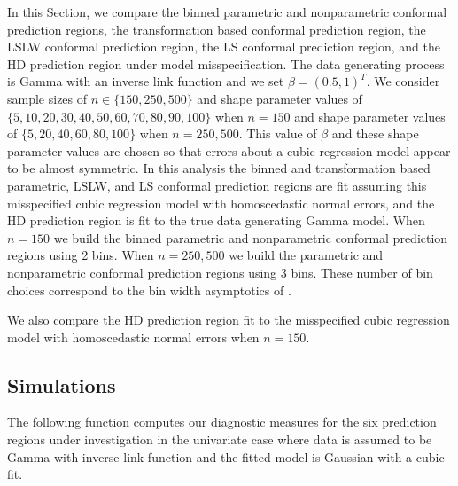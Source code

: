 \documentclass[11pt]{article}\usepackage[]{graphicx}\usepackage[]{color}
\begin{document}
In this Section, we compare the binned parametric and nonparametric conformal 
prediction regions, the transformation based conformal prediction region, 
the LSLW conformal prediction region, the LS conformal prediction region, 
and the HD prediction region under model misspecification.  The data 
generating process is Gamma with an inverse link function and we set 
$\beta = (0.5, 1)^T$.   We consider sample sizes of $n \in \{150, 250, 500\}$ 
and shape parameter values of $\{5, 10, 20, 30, 40, 50, 60, 70, 80, 90, 100\}$ 
when $n = 150$ and shape parameter values of $\{5, 20, 40, 60, 80, 100\}$ 
when $n = 250, 500$.  This value of $\beta$ and these shape parameter values 
are chosen so that errors about a cubic regression model appear to be almost 
symmetric.  In this analysis the binned and transformation based parametric, 
LSLW, and LS conformal prediction regions are fit assuming this misspecified 
cubic regression model with homoscedastic normal errors, and the HD prediction 
region is fit to the true data generating Gamma model.  When $n = 150$ we 
build the binned parametric and nonparametric conformal prediction regions 
using 2 bins.  When $n = 250, 500$ we build the parametric and nonparametric 
conformal prediction regions using 3 bins.  These number of bin choices 
correspond to the bin width asymptotics of \citet{lei2014distribution}. 

We also compare the HD prediction region fit to the misspecified cubic 
regression model with homoscedastic normal errors when $n = 150$.  


\subsection{Simulations}

The following function computes our diagnostic measures for the six 
prediction regions under investigation in the univariate case where data 
is assumed to be Gamma with inverse link function and the fitted model is 
Gaussian with a cubic fit.  
\end{document}
